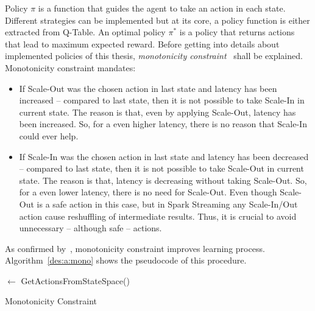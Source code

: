 Policy $\pi$ is a function that guides the agent to take an action in each state. Different strategies can be implemented but at its core, a policy function is either extracted from Q-Table. An optimal policy $\pi^*$ is a policy that returns actions that lead to maximum expected reward. Before getting into details about implemented policies of this thesis, \emph{monotonicity constraint}~\cite{Herodotou:2011} shall be explained. Monotonicity constraint mandates:
\begin{itemize}
    \item If Scale-Out was the chosen action in last state and latency has been increased -- compared to last state, then it is not possible to take Scale-In in current state. The reason is that, even by applying Scale-Out, latency has been increased. So, for a even higher latency, there is no reason that Scale-In could ever help.
    \item If Scale-In was the chosen action in last state and latency has been decreased -- compared to last state, then it is not possible to take Scale-Out in current state. The reason is that, latency is decreasing without taking Scale-Out. So, for a even lower latency, there is no need for Scale-Out. Even though Scale-Out is a safe action in this case, but in Spark Streaming any Scale-In/Out action cause reshuffling of intermediate results. Thus, it is crucial to avoid unnecessary -- although safe -- actions.
\end{itemize}
As confirmed by~\textcite{Heinze:2014}, monotonicity constraint improves learning process. Algorithm~\ref{des:a:mono} shows the pseudocode of this procedure.
\begin{algorithm}[h]
    \DontPrintSemicolon
    \ca $\gets$ GetActionsFromStateSpace(\cs)\;
    \BlankLine
    \BlankLine
    \caption{Monotonicity Constraint}
    \label{des:a:mono}
\end{algorithm}


